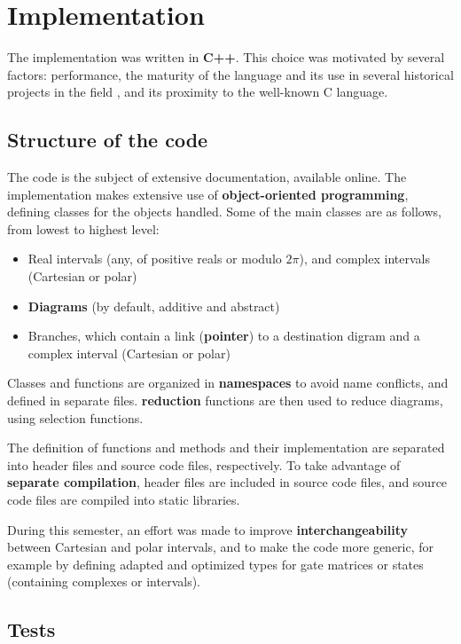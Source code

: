 \chapter{Implementation}
\label{ch:Implementation}

The implementation was written in \textbf{C++}. This choice was motivated by several factors: performance, the maturity of the language and its use in several historical projects in the field \cite{Bichsel_2023} \cite{QTranslator}, and its proximity to the well-known C language.

\section{Structure of the code}

The code is the subject of extensive documentation, available online. \cite{Leroy_doc}
The implementation makes extensive use of \textbf{object-oriented programming}, defining classes for the objects handled.
Some of the main classes are as follows, from lowest to highest level:
\begin{itemize}
  \item Real intervals (any, of positive reals or modulo $2\pi$), and complex intervals (Cartesian or polar)
  \item \textbf{Diagrams} (by default, additive and abstract)
  \item Branches, which contain a link (\textbf{pointer}) to a destination digram and a complex interval (Cartesian or polar)
\end{itemize}

Classes and functions are organized in \textbf{namespaces} to avoid name conflicts, and defined in separate files. \textbf{reduction} functions are then used to reduce diagrams, using selection functions.

The definition of functions and methods and their implementation are separated into header files and source code files, respectively. To take advantage of \textbf{separate compilation}, header files are included in source code files, and source code files are compiled into static libraries.

During this semester, an effort was made to improve \textbf{interchangeability} between Cartesian and polar intervals, and to make the code more generic, for example by defining adapted and optimized types for gate matrices or states (containing complexes or intervals).

\section{Tests}

